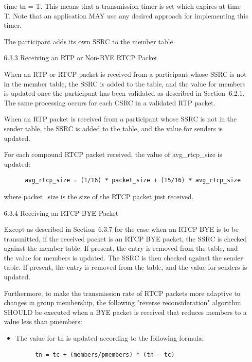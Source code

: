 \documentclass{article}
\begin{document}
time tn = T.  This means that a transmission timer is set which expires at time T.  Note that an application MAY use any desired approach for implementing this timer.

The participant adds its own SSRC to the member table.

6.3.3 Receiving an RTP or Non-BYE RTCP Packet

When an RTP or RTCP packet is received from a participant whose SSRC is not in the member table, the SSRC is added to the table, and the value for members is updated once the participant has been validated as described in Section~6.2.1.  The same processing occurs for each CSRC in a validated RTP packet.

When an RTP packet is received from a participant whose SSRC is not in the sender table, the SSRC is added to the table, and the value for senders is updated.

For each compound RTCP packet received, the value of avg\_rtcp\_size is updated:

\begin{verbatim}
      avg_rtcp_size = (1/16) * packet_size + (15/16) * avg_rtcp_size
\end{verbatim}

where packet\_size is the size of the RTCP packet just received.

6.3.4 Receiving an RTCP BYE Packet

Except as described in Section~6.3.7 for the case when an RTCP BYE is to be transmitted, if the received packet is an RTCP BYE packet, the SSRC is checked against the member table.  If present, the entry is removed from the table, and the value for members is updated.  The SSRC is then checked against the sender table.  If present, the entry is removed from the table, and the value for senders is updated.

Furthermore, to make the transmission rate of RTCP packets more adaptive to changes in group membership, the following "reverse reconsideration" algorithm SHOULD be executed when a BYE packet is received that reduces members to a value less than pmembers:

\begin{itemize}
\item The value for tn is updated according to the following formula:
\end{itemize}
\begin{verbatim}
         tn = tc + (members/pmembers) * (tn - tc)
\end{verbatim}
\end{document}
